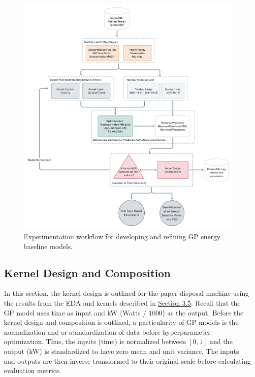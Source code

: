 \begin{figure}[H]
\centering
\graphicspath{ {./images/} }
\includegraphics[scale=0.32]{images/experiment_flow.png}
\caption{Experimentation workflow for developing and refining GP energy baseline models.}
\end{figure}

\subsection{Kernel Design and Composition}

In this section, the kernel design is outlined for the paper disposal machine using the results from the EDA and kernels described in \hyperlink{subsection.3.5}{Section 3.5}. Recall that the GP model uses time as input and kW (Watts / $1000$) as the output. Before the kernel design and composition is outlined, a particularity of GP models is the normalization and or standardization of data before hyperparameter optimization. Thus, the inputs (time) is normalized between $[0, 1]$ and the output (kW) is standardized to have zero mean and unit variance. The inputs and outputs are then inverse transformed to their original scale before calculating evaluation metrics.

